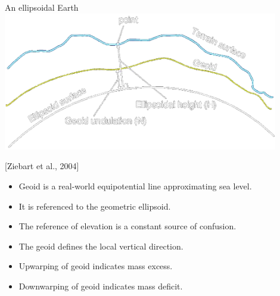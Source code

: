 

\begin{frame}
  \begin{PointSix}{An ellipsoidal Earth}
      \includegraphics[width=0.9\textwidth]{Figures/Gravity/Exported/Geoid_Ziebart2004_TransparentBlack.png}

      \tiny [Ziebart et al., 2004] 

      \small
      {
        \begin{itemize}
          \item Geoid is a real-world equipotential line approximating sea level.
          \item It is referenced to the geometric ellipsoid.
        \end{itemize}
      }
      {
        \begin{itemize}
          \item The reference of elevation is a constant source of confusion.
          \item The geoid defines the local vertical direction.
        \end{itemize}
      }
      {
        \begin{itemize}
          \item Upwarping of geoid indicates mass excess.
          \item Downwarping of geoid indicates mass deficit.
        \end{itemize}
      }
  \end{PointSix}
  \end{frame}


